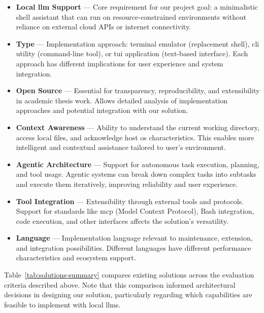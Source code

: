 \begin{itemize}
  \item \textbf{Local \gls{llm} Support} --- Core requirement for our
    project goal: a minimalistic shell assistant that can run on
    resource-constrained environments without reliance on external
    cloud APIs or internet connectivity.

  \item \textbf{Type} --- Implementation approach: terminal emulator
    (replacement shell), \gls{cli} utility (command-line tool), or
    \gls{tui} application (text-based interface). Each approach has
    different implications for user experience and system integration.

  \item \textbf{Open Source} --- Essential for transparency,
    reproducibility, and extensibility in academic thesis work.
    Allows detailed analysis of implementation approaches and
    potential integration with our solution.

  \item \textbf{Context Awareness} --- Ability to understand the
    current working directory, access local files, and acknowledge
    host \gls{os} characteristics. This enables more intelligent and
    contextual assistance tailored to user's environment.

  \item \textbf{Agentic Architecture} --- Support for autonomous task
    execution, planning, and tool usage. Agentic systems can break
    down complex tasks into subtasks and execute them iteratively,
    improving reliability and user experience.

  \item \textbf{Tool Integration} --- Extensibility through external
    tools and protocols. Support for standards like \gls{mcp} (Model
    Context Protocol), Bash integration, code execution, and other
    interfaces affects the solution's versatility.

  \item \textbf{Language} --- Implementation language relevant to
    maintenance, extension, and integration possibilities. Different
    languages have different performance characteristics and ecosystem support.
\end{itemize}

Table~\ref{tab:solutions-summary} compares existing solutions across
the evaluation criteria
described above. Note that this comparison informed architectural decisions in
designing our solution, particularly regarding which capabilities are feasible
to implement with local \glspl{llm}.

